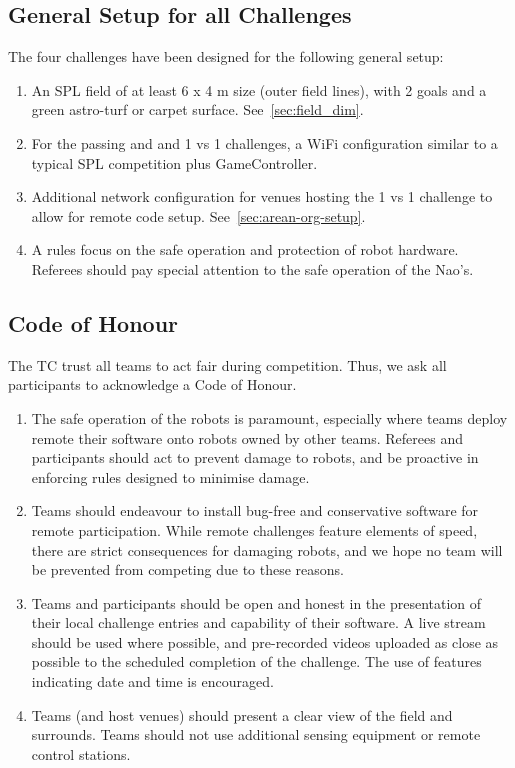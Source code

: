 \subsection{General Setup for all Challenges}

The four challenges have been designed for the following general setup:
\begin{enumerate}
    \item An SPL field of at least 6 x 4 m size (outer field lines), with 2 goals and a green astro-turf or carpet surface. See~\ref{sec:field_dim}.
    \item For the passing and and 1 vs 1 challenges, a WiFi configuration similar to a typical SPL competition plus GameController. 
    \item Additional network configuration for venues hosting the 1 vs 1 challenge to allow for remote code setup. See~\ref{sec:arean-org-setup}.
    \item A rules focus on the safe operation and protection of robot hardware. Referees should pay special attention to the safe operation of the Nao's.
\end{enumerate}

\subsection{Code of Honour}

The TC trust all teams to act fair during competition. Thus, we ask all participants to acknowledge a Code of Honour.
\begin{enumerate}
    \item The safe operation of the robots is paramount, especially where teams deploy remote their software onto robots owned by other teams. Referees and participants should act to prevent damage to robots, and be proactive in enforcing rules  designed to minimise damage.
    \item Teams should endeavour to install bug-free and conservative software for remote participation. While remote challenges feature elements of speed, there are strict consequences for damaging robots, and we hope no team will be prevented from competing due to these reasons.
    \item Teams and participants should be open and honest in the presentation of their local challenge entries and capability of their software.  A live stream should be used where possible, and pre-recorded videos uploaded as close as possible to the scheduled completion of the challenge. The use of features indicating date and time is encouraged.
    \item Teams (and host venues) should present a clear view of the field and surrounds. Teams should not use additional sensing equipment or remote control stations.
\end{enumerate} 

